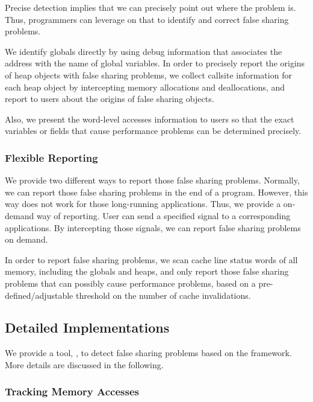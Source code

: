Precise detection implies that we can precisely point out where the problem is. Thus, programmers can leverage on that to identify and correct false sharing problems. 

We identify globals directly by using debug information that associates the address with the name of global variables. In order to precisely report the origins of heap objects with false sharing problems, we collect callsite information for each heap object by intercepting memory allocations and deallocations, and report to users about the origins of false sharing objects. 

Also, we present the word-level accesses information to users so that the exact variables or fields that cause performance problems can be determined precisely. 

\subsubsection{Flexible Reporting}
\label{sec:flexiblereport}

We provide two different ways to report those false sharing problems. Normally, we can report those false sharing problems in the end of a program. However, this way does not work for those long-running applications. Thus, we provide a on-demand way of reporting. User can send a specified signal to a corresponding applications. By intercepting those signals, we can report false sharing problems on demand. 

In order to report false sharing problems, we scan cache line status words of all memory, including the globals and heaps,  and only report those false sharing problems that can possibly cause performance problems, based on a pre-defined/adjustable threshold on the number of cache invalidations.  

\subsection{Detailed Implementations}

\label{sec:sheriffdetect}
We provide a tool, \SheriffDetect{}, to detect false sharing problems based on the \sheriff{} framework. More details are discussed in the following. 

\subsubsection{Tracking Memory Accesses}
\label{sec:memoryaccesses}


